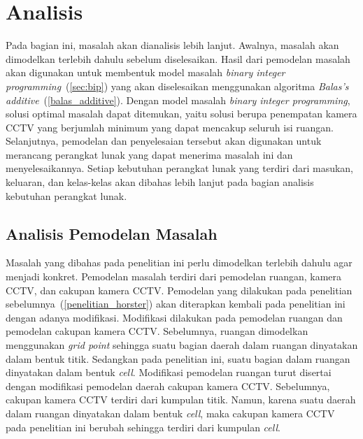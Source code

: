 \chapter{Analisis}
Pada bagian ini, masalah akan dianalisis lebih lanjut. Awalnya, masalah akan dimodelkan terlebih dahulu sebelum diselesaikan. Hasil dari pemodelan masalah akan digunakan untuk membentuk model masalah \textit{binary integer programming}~(\ref{sec:bip}) yang akan diselesaikan menggunakan algoritma \textit{Balas's additive}~(\ref{balas_additive}). Dengan model masalah \textit{binary integer programming}, solusi optimal masalah dapat ditemukan, yaitu solusi berupa penempatan kamera CCTV yang berjumlah minimum yang dapat mencakup seluruh isi ruangan. Selanjutnya, pemodelan dan penyelesaian tersebut akan digunakan untuk merancang perangkat lunak yang dapat menerima masalah ini dan menyelesaikannya. Setiap kebutuhan perangkat lunak yang terdiri dari masukan, keluaran, dan kelas-kelas akan dibahas lebih lanjut pada bagian analisis kebutuhan perangkat lunak.

\section{Analisis Pemodelan Masalah}
Masalah yang dibahas pada penelitian ini perlu dimodelkan terlebih dahulu agar menjadi konkret. Pemodelan masalah terdiri dari pemodelan ruangan, kamera CCTV, dan cakupan kamera CCTV. Pemodelan yang dilakukan pada penelitian sebelumnya~(\ref{penelitian_horster}) akan diterapkan kembali pada penelitian ini dengan adanya modifikasi. Modifikasi dilakukan pada pemodelan ruangan dan pemodelan cakupan kamera CCTV. Sebelumnya, ruangan dimodelkan menggunakan \textit{grid point} sehingga suatu bagian daerah dalam ruangan dinyatakan dalam bentuk titik. Sedangkan pada penelitian ini, suatu bagian dalam ruangan dinyatakan dalam bentuk \textit{cell}. Modifikasi pemodelan ruangan turut disertai dengan modifikasi pemodelan daerah cakupan kamera CCTV. Sebelumnya, cakupan kamera CCTV terdiri dari kumpulan titik. Namun, karena suatu daerah dalam ruangan dinyatakan dalam bentuk \textit{cell}, maka cakupan kamera CCTV pada penelitian ini berubah sehingga terdiri dari kumpulan \textit{cell}.



